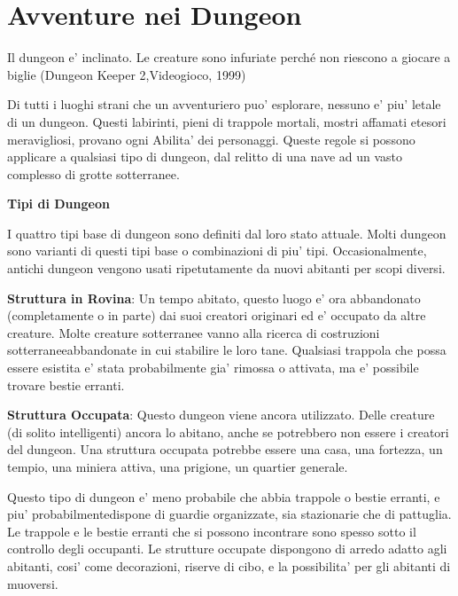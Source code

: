 \documentclass[a4paper,11pt,twoside,openany]{dndbook}
\begin{document}
{\pagebreak

\section{Avventure nei Dungeon}

\label{avventure-nei-dungeon}
\begin{quotebox}
Il dungeon e' inclinato. Le creature sono infuriate perché non riescono a giocare a biglie (Dungeon Keeper 2,Videogioco, 1999)
\end{quotebox}

Di tutti i luoghi strani che un avventuriero puo' esplorare, nessuno e' piu' letale di un dungeon. Questi labirinti, pieni di trappole mortali, mostri affamati etesori meravigliosi, provano ogni Abilita' dei personaggi. Queste regole si possono applicare a qualsiasi tipo di dungeon, dal relitto di una nave ad un vasto complesso di grotte sotterranee.

\textbf{Tipi di Dungeon}

I quattro tipi base di dungeon sono definiti dal loro stato attuale. Molti dungeon sono varianti di questi tipi base o combinazioni di piu' tipi. Occasionalmente, antichi dungeon vengono usati ripetutamente da nuovi abitanti per scopi diversi.

\textbf{Struttura in Rovina}: Un tempo abitato, questo luogo e' ora abbandonato (completamente o in parte) dai suoi creatori originari ed e' occupato da altre creature. Molte creature sotterranee vanno alla ricerca di costruzioni sotterraneeabbandonate in cui stabilire le loro tane. Qualsiasi trappola che possa essere esistita e' stata probabilmente gia' rimossa o attivata, ma e' possibile trovare bestie erranti.

\textbf{Struttura Occupata}: Questo dungeon viene ancora utilizzato. Delle creature (di solito intelligenti) ancora lo abitano, anche se potrebbero non essere i creatori del dungeon. Una struttura occupata potrebbe essere una casa, una fortezza, un tempio, una miniera attiva, una prigione, un quartier generale. 

Questo tipo di dungeon e' meno probabile che abbia trappole o bestie erranti, e piu' probabilmentedispone di guardie organizzate, sia stazionarie che di pattuglia. Le trappole e le bestie erranti che si possono incontrare sono spesso sotto il controllo degli occupanti. Le strutture occupate dispongono di arredo adatto agli abitanti, cosi' come decorazioni, riserve di cibo, e la possibilita' per gli abitanti di muoversi.

}
\end{document}
